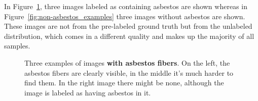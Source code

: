 In Figure~\ref{fig:asbestos_examples}, three images labeled as containing asbestos are shown whereas in Figure~\ref{fig:non-asbestos_examples} three images without asbestos are shown. These images are not from the pre-labeled ground truth but from the unlabeled distribution, which comes in a different quality and makes up the majority of all samples. \\

\begin{figure}[h]
\centering
\caption{Three examples of images \textbf{with asbestos fibers}. On the left, the asbestos fibers are clearly visible, in the middle it's much harder to find them. In the right image there might be none, although the image is labeled as having asbestos in it.}
\label{fig:asbestos_examples}
\end{figure}

